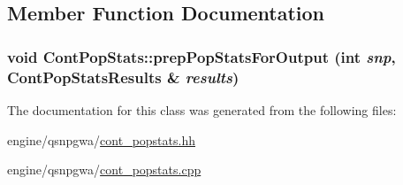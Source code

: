 \subsection{Member Function Documentation}
\hypertarget{classContPopStats_a6af3b120a6775e035946fff299e4da1b}{
\subsubsection[{prepPopStatsForOutput}]{\setlength{\rightskip}{0pt plus 5cm}void ContPopStats::prepPopStatsForOutput (int {\em snp}, \/  {\bf ContPopStatsResults} \& {\em results})}}
\label{classContPopStats_a6af3b120a6775e035946fff299e4da1b}


The documentation for this class was generated from the following files:\begin{DoxyCompactItemize}
\item 
engine/qsnpgwa/\hyperlink{cont__popstats_8hh}{cont\_\-popstats.hh}\item 
engine/qsnpgwa/\hyperlink{cont__popstats_8cpp}{cont\_\-popstats.cpp}\end{DoxyCompactItemize}

